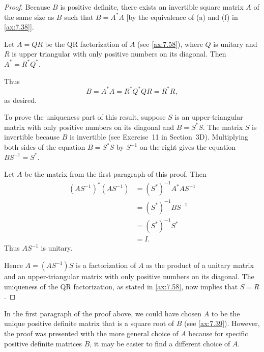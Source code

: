 \begin{proof}
Because $B$ is positive definite, there exists an invertible square matrix $A$
of the same size as $B$ such that $B=A^*A$ [by the equivalence of (a) and (f) in
\ref{ax:7.38}].

Let $A=QR$ be the QR factorization of $A$ (see \ref{ax:7.58}), where $Q$ is
unitary and $R$ is upper triangular with only positive numbers on its diagonal.
Then $A^*=R^*Q^*$.

%
Thus
\[ B=A^*A=R^*Q^*QR=R^*R, \]
as desired.

To prove the uniqueness part of this result, suppose $S$ is an upper-triangular
matrix with only positive numbers on its diagonal and $B=S^*S$. The matrix $S$
is invertible because $B$ is invertible (see Exercise~11 in Section~3D).
Multiplying both sides of the equation $B=S^*S$ by $S^{-1}$ on the right gives
the equation $BS^{-1}=S^*$.

Let $A$ be the matrix from the first paragraph of this proof. Then
\begin{align*}
(AS^{-1})^*(AS^{-1}) &= (S^*)^{-1}A^*AS^{-1}\\
  &= (S^*)^{-1}BS^{-1}\\
  &= (S^*)^{-1}S^*\\
  &= I.
\end{align*}
Thus $AS^{-1}$ is unitary.

Hence $A=(AS^{-1})S$ is a factorization of $A$ as the product of a unitary
matrix and an upper-triangular matrix with only positive numbers on its
diagonal. The uniqueness of the QR factorization, as stated in \ref{ax:7.58},
now implies that $S=R$.
\end{proof}

In the first paragraph of the proof above, we could have chosen $A$ to be the
unique positive definite matrix that is a square root of $B$ (see
\ref{ax:7.39}). However, the proof was presented with the more general choice of
$A$ because for specific positive definite matrices $B$, it may be easier to
find a different choice of $A$.


